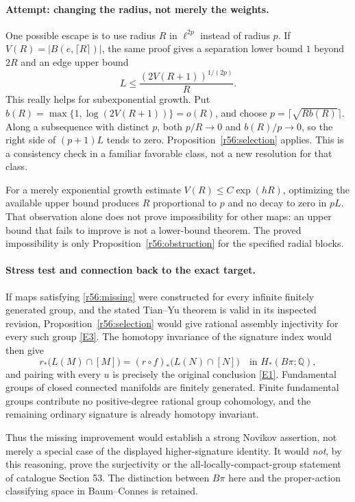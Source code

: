 \documentclass[11pt,a4paper]{article}
\newcommand{\Q}{\mathbb{Q}}
\newcommand{\eref}[2]{\hyperlink{extra:#1:#2}{[E#2]}}
\numberwithin{equation}{section}
\begin{document}
\paragraph{Attempt: changing the radius, not merely the weights.}
One possible escape is to use radius $R$ in $\ell^{2p}$ instead of radius $p$. If $V(R)=|B(e,\lceil R\rceil)|$, the same proof gives a separation lower bound $1$ beyond $2R$ and an edge upper bound
\begin{equation}\label{r56:larger-radius}
 L\leq\frac{(2V(R+1))^{1/(2p)}}{R}.
\end{equation}
This really helps for subexponential growth. Put
$b(R)=\max\{1,\log(2V(R+1))\}=o(R)$, and choose
$p=\lceil\sqrt{Rb(R)}\rceil$. Along a subsequence with distinct $p$, both $p/R\to0$ and $b(R)/p\to0$, so the right side of $(p+1)L$ tends to zero. Proposition~\ref{r56:selection} applies. This is a consistency check in a familiar favorable class, not a new resolution for that class.

For a merely exponential growth estimate $V(R)\leq C\exp(hR)$, optimizing the available upper bound produces $R$ proportional to $p$ and no decay to zero in $pL$. That observation alone does not prove impossibility for other maps: an upper bound that fails to improve is not a lower-bound theorem. The proved impossibility is only Proposition~\ref{r56:obstruction} for the specified radial blocks.

\paragraph{Stress test and connection back to the exact target.}
If maps satisfying \eqref{r56:missing} were constructed for every infinite finitely generated group, and the stated Tian--Yu theorem is valid in its inspected revision, Proposition~\ref{r56:selection} would give rational assembly injectivity for every such group \eref{statement}{3}. The homotopy invariance of the signature index would then give
\[
 r_*\bigl(L(M)\cap[M]\bigr)
  =(r\circ f)_*\bigl(L(N)\cap[N]\bigr)
       \quad\text{in }H_*(B\pi;\Q),
\]
and pairing with every $u$ is precisely the original conclusion \eref{statement}{1}. Fundamental groups of closed connected manifolds are finitely generated. Finite fundamental groups contribute no positive-degree rational group cohomology, and the remaining ordinary signature is already homotopy invariant.

Thus the missing improvement would establish a strong Novikov assertion, not merely a special case of the displayed higher-signature identity. It would \emph{not}, by this reasoning, prove the surjectivity or the all-locally-compact-group statement of catalogue Section 53. The distinction between $B\pi$ here and the proper-action classifying space in Baum--Connes is retained.
\end{document}
